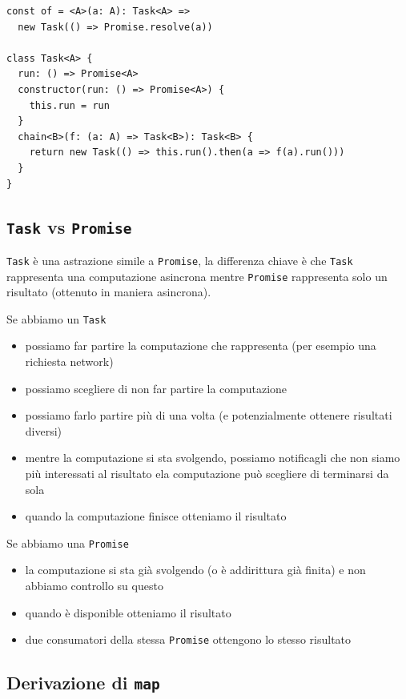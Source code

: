 \documentclass[12pt]{article}
\begin{document}
\begin{verbatim}
const of = <A>(a: A): Task<A> =>
  new Task(() => Promise.resolve(a))

class Task<A> {
  run: () => Promise<A>
  constructor(run: () => Promise<A>) {
    this.run = run
  }
  chain<B>(f: (a: A) => Task<B>): Task<B> {
    return new Task(() => this.run().then(a => f(a).run()))
  }
}
\end{verbatim}

\subsection{\texttt{Task} vs \texttt{Promise}}

\texttt{Task} è una astrazione simile a \texttt{Promise}, la differenza chiave è che \texttt{Task} rappresenta una computazione asincrona
mentre \texttt{Promise} rappresenta solo un risultato (ottenuto in maniera asincrona).

Se abbiamo un \texttt{Task}

\begin{itemize}
  \item possiamo far partire la computazione che rappresenta (per esempio una richiesta network)
  \item possiamo scegliere di non far partire la computazione
  \item possiamo farlo partire più di una volta (e potenzialmente ottenere risultati diversi)
  \item mentre la computazione si sta svolgendo, possiamo notificagli che non siamo più interessati al risultato ela computazione può scegliere di terminarsi da sola
  \item quando la computazione finisce otteniamo il risultato
\end{itemize}

Se abbiamo una \texttt{Promise}

\begin{itemize}
  \item la computazione si sta già svolgendo (o è addirittura già finita) e non abbiamo controllo su questo
  \item quando è disponible otteniamo il risultato
  \item due consumatori della stessa \texttt{Promise} ottengono lo stesso risultato
\end{itemize}

\subsection{Derivazione di \texttt{map}}
\end{document}
